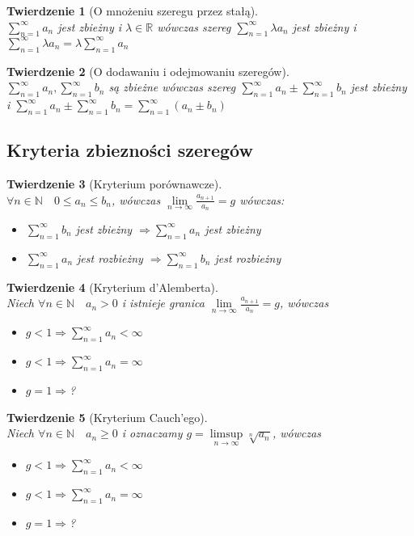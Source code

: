 \documentclass[12pt,a4paper]{article}
\newtheorem{tw}{Twierdzenie}
\theoremstyle{definition}
\begin{document}
\begin{tw}[O mnożeniu szeregu przez stałą]~\\
$\sum\limits_{n=1}^\infty a_n$ jest zbieżny i $\lambda\in\mathbb{R}$ wówczas szereg $\sum\limits_{n=1}^\infty \lambda a_n$ jest zbieżny i $\sum\limits_{n=1}^\infty \lambda a_n = \lambda \sum\limits_{n=1}^\infty a_n$
\end{tw}
\begin{tw}[O dodawaniu i odejmowaniu szeregów]~\\
$\sum\limits_{n=1}^\infty a_n, \sum\limits_{n=1}^\infty b_n$ są zbieżne wówczas szereg $\sum\limits_{n=1}^\infty a_n \pm \sum\limits_{n=1}^\infty b_n$ jest zbieżny i $\sum\limits_{n=1}^\infty a_n \pm \sum\limits_{n=1}^\infty b_n = \sum\limits_{n=1}^\infty (a_n \pm b_n)$
\end{tw}

\subsection{Kryteria zbiezności szeregów}

\begin{tw}[Kryterium porównawcze]~\\
$\forall n\in\mathbb{N} \quad 0 \leqslant a_n \leqslant b_n$, wówczas
$\lim\limits_{n \to \infty} \frac{a_{n+1}}{a_n} = g$ wówczas:
\begin{itemize}
	\item $\sum\limits_{n=1}^\infty b_n$ jest zbieżny $\Rightarrow \sum\limits_{n=1}^\infty a_n$ jest zbieżny
	\item $\sum\limits_{n=1}^\infty a_n$ jest rozbieżny $\Rightarrow \sum\limits_{n=1}^\infty b_n$ jest rozbieżny
\end{itemize}
\end{tw}

\begin{tw}[Kryterium d'Alemberta]~\\
Niech $\forall n\in\mathbb{N} \quad a_n > 0$ i istnieje granica 
$\lim\limits_{n\to\infty} \frac{a_{n+1}}{a_n} = g$, wówczas
\begin{itemize}
	\item $g < 1 \Rightarrow \sum\limits_{n=1}^\infty a_n < \infty$
	\item $g < 1 \Rightarrow \sum\limits_{n=1}^\infty a_n = \infty$
	\item $g = 1 \Rightarrow $?
\end{itemize}
\end{tw}

\begin{tw}[Kryterium Cauch'ego]~\\
Niech $\forall n\in\mathbb{N} \quad a_n \geqslant 0$ i oznaczamy $g = \limsup\limits_{n\to\infty} \sqrt[n]{a_n}$, wówczas
\begin{itemize}
	\item $g < 1 \Rightarrow \sum\limits_{n=1}^\infty a_n < \infty$
	\item $g < 1 \Rightarrow \sum\limits_{n=1}^\infty a_n = \infty$
	\item $g = 1 \Rightarrow $?
\end{itemize}
\end{tw}
\end{document}
